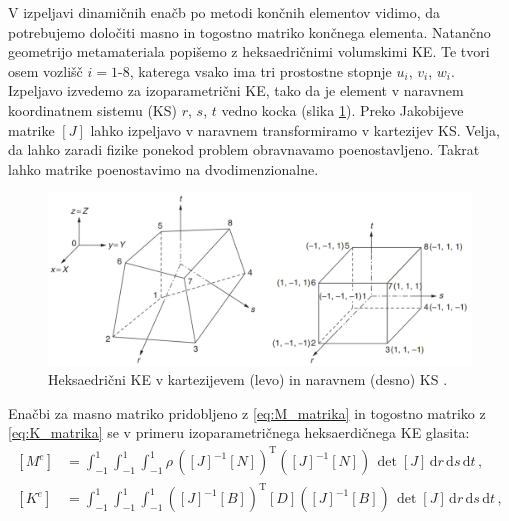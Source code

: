         V izpeljavi dinamičnih enačb po metodi končnih elementov vidimo, da potrebujemo določiti masno in togostno matriko končnega elementa. Natančno geometrijo metamateriala popišemo z heksaedričnimi volumskimi KE. Te tvori osem vozlišč $i=1\text{-}8$, katerega vsako ima tri prostostne stopnje $u_i$, $v_i$, $w_i$. Izpeljavo izvedemo za izoparametrični KE, tako da je element v naravnem koordinatnem sistemu (KS) $r$, $s$, $t$ vedno kocka (slika \ref{fig:heksaedricni_KE}). Preko Jakobijeve matrike $[J]$ lahko izpeljavo v naravnem transformiramo v kartezijev KS. Velja, da lahko zaradi fizike ponekod problem obravnavamo poenostavljeno. Takrat lahko matrike poenostavimo na dvodimenzionalne. 
        \begin{figure}[!hb]
            \centering
            \includegraphics[scale=0.65]{slike/teorija/heksaedricni_KE.png}
            \caption{Heksaedrični KE v kartezijevem (levo) in naravnem (desno) KS \cite{rao2010theFEMinEngineering}. }\label{fig:heksaedricni_KE}
        \end{figure}
        
        Enačbi za masno matriko pridobljeno z \eqref{eq:M_matrika} in togostno matriko z \eqref{eq:K_matrika} se v primeru izoparametričnega heksaerdičnega KE glasita:
        \begin{align}
            \left[M^{e}\right]&=\int_{-1}^{1}\int_{-1}^{1}\int_{-1}^{1} 
            \rho \, ([J]^{-1}[N])^{\text{T}}([J]^{-1}[N]) \, \operatorname{det}[J] 
            \, \mathrm{d} r\, \mathrm{d} s\, \mathrm{d} t \,, \\
            \left[K^{e}\right]&=\int_{-1}^{1}\int_{-1}^{1}\int_{-1}^{1}
            ([J]^{-1}[B])^{\text{T}}[D]([J]^{-1}[B]) \, \operatorname{det}[J] 
            \, \mathrm{d} r\, \mathrm{d} s\, \mathrm{d} t \,,
        \end{align}
        
